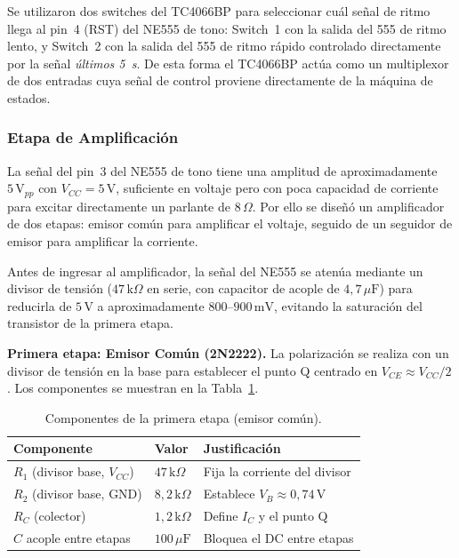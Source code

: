 \documentclass[12pt,onecolumn]{IEEEtran}
\begin{document}
Se utilizaron dos switches del TC4066BP para seleccionar cuál señal de ritmo llega al pin~4 (RST) del NE555 de tono: Switch~1 con la salida del 555 de ritmo lento, y Switch~2 con la salida del 555 de ritmo rápido controlado directamente por la señal \textit{últimos 5~s}. De esta forma el TC4066BP actúa como un multiplexor de dos entradas cuya señal de control proviene directamente de la máquina de estados.

\subsubsection{Etapa de Amplificación}

La señal del pin~3 del NE555 de tono tiene una amplitud de aproximadamente $5\,\text{V}_{pp}$ con $V_{CC} = 5\,\text{V}$, suficiente en voltaje pero con poca capacidad de corriente para excitar directamente un parlante de $8\,\Omega$. Por ello se diseñó un amplificador de dos etapas: emisor común para amplificar el voltaje, seguido de un seguidor de emisor para amplificar la corriente.

Antes de ingresar al amplificador, la señal del NE555 se atenúa mediante un divisor de tensión ($47\,\text{k}\Omega$ en serie, con capacitor de acople de $4{,}7\,\mu\text{F}$) para reducirla de $5\,\text{V}$ a aproximadamente $800$--$900\,\text{mV}$, evitando la saturación del transistor de la primera etapa.

\textbf{Primera etapa: Emisor Común (2N2222).}
La polarización se realiza con un divisor de tensión en la base para establecer el punto Q centrado en $V_{CE} \approx V_{CC}/2$ \cite{2n2222ds}. Los componentes se muestran en la Tabla~\ref{tab:emisor_comun}.

\begin{table}[H]
\centering
\caption{Componentes de la primera etapa (emisor común).}
\label{tab:emisor_comun}
\begin{tabular}{lll}
\toprule
\textbf{Componente} & \textbf{Valor} & \textbf{Justificación} \\
\midrule
$R_1$ (divisor base, $V_{CC}$) & $47\,\text{k}\Omega$    & Fija la corriente del divisor \\
$R_2$ (divisor base, GND)      & $8{,}2\,\text{k}\Omega$ & Establece $V_B \approx 0{,}74\,\text{V}$ \\
$R_C$ (colector)               & $1{,}2\,\text{k}\Omega$ & Define $I_C$ y el punto Q \\
$C$ acople entre etapas        & $100\,\mu\text{F}$      & Bloquea el DC entre etapas \\
\bottomrule
\end{tabular}
\end{table}
\end{document}
